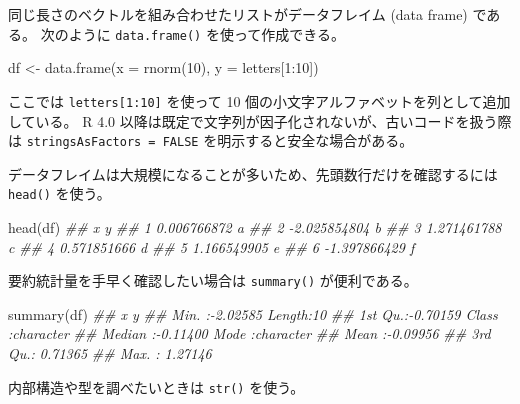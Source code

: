 \documentclass[
  letterpaper,
  xelatex,
  ja=standard, xelatex]{bxjsbook}
\newenvironment{Shaded}{\begin{snugshade}}{\end{snugshade}}
\newcommand{\AttributeTok}[1]{\textcolor[rgb]{0.40,0.45,0.13}{#1}}
\newcommand{\DecValTok}[1]{\textcolor[rgb]{0.68,0.00,0.00}{#1}}
\newcommand{\DocumentationTok}[1]{\textcolor[rgb]{0.37,0.37,0.37}{\textit{#1}}}
\newcommand{\FunctionTok}[1]{\textcolor[rgb]{0.28,0.35,0.67}{#1}}
\newcommand{\NormalTok}[1]{\textcolor[rgb]{0.00,0.23,0.31}{#1}}
\newcommand{\OtherTok}[1]{\textcolor[rgb]{0.00,0.23,0.31}{#1}}
\newcommand{\SpecialCharTok}[1]{\textcolor[rgb]{0.37,0.37,0.37}{#1}}
\begin{document}
同じ長さのベクトルを組み合わせたリストがデータフレイム (data frame)
である。 次のように \texttt{data.frame()} を使って作成できる。

\begin{Shaded}
\begin{Highlighting}[]
\NormalTok{df }\OtherTok{\textless{}{-}} \FunctionTok{data.frame}\NormalTok{(}\AttributeTok{x =} \FunctionTok{rnorm}\NormalTok{(}\DecValTok{10}\NormalTok{), }\AttributeTok{y =}\NormalTok{ letters[}\DecValTok{1}\SpecialCharTok{:}\DecValTok{10}\NormalTok{])}
\end{Highlighting}
\end{Shaded}

ここでは \texttt{letters{[}1:10{]}} を使って 10
個の小文字アルファベットを列として追加している。 R 4.0
以降は既定で文字列が因子化されないが、古いコードを扱う際は
\texttt{stringsAsFactors\ =\ FALSE} を明示すると安全な場合がある。

データフレイムは大規模になることが多いため、先頭数行だけを確認するには
\texttt{head()} を使う。

\begin{Shaded}
\begin{Highlighting}[]
\FunctionTok{head}\NormalTok{(df)}
\DocumentationTok{\#\#              x y}
\DocumentationTok{\#\# 1  0.006766872 a}
\DocumentationTok{\#\# 2 {-}2.025854804 b}
\DocumentationTok{\#\# 3  1.271461788 c}
\DocumentationTok{\#\# 4  0.571851666 d}
\DocumentationTok{\#\# 5  1.166549905 e}
\DocumentationTok{\#\# 6 {-}1.397866429 f}
\end{Highlighting}
\end{Shaded}

要約統計量を手早く確認したい場合は \texttt{summary()} が便利である。

\begin{Shaded}
\begin{Highlighting}[]
\FunctionTok{summary}\NormalTok{(df)}
\DocumentationTok{\#\#        x                 y            }
\DocumentationTok{\#\#  Min.   :{-}2.02585   Length:10         }
\DocumentationTok{\#\#  1st Qu.:{-}0.70159   Class :character  }
\DocumentationTok{\#\#  Median :{-}0.11400   Mode  :character  }
\DocumentationTok{\#\#  Mean   :{-}0.09956                     }
\DocumentationTok{\#\#  3rd Qu.: 0.71365                     }
\DocumentationTok{\#\#  Max.   : 1.27146}
\end{Highlighting}
\end{Shaded}

内部構造や型を調べたいときは \texttt{str()} を使う。
\end{document}

